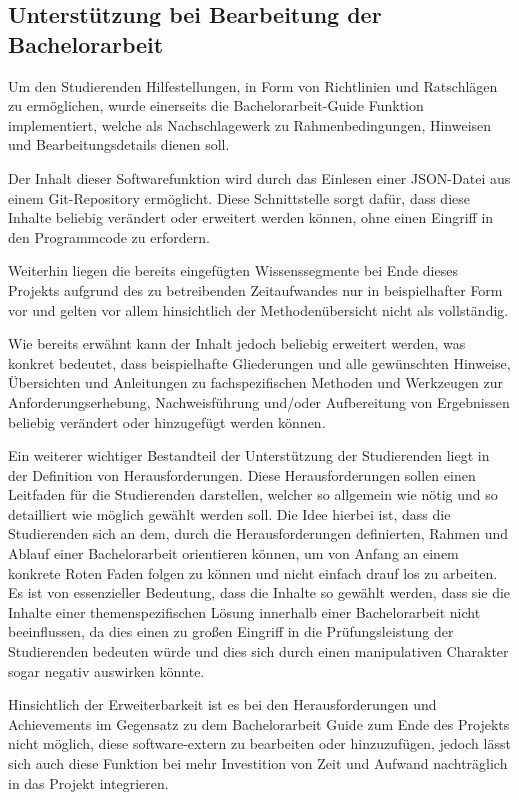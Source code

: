 \documentclass[bibliography=totoc,listof=totoc,BCOR=5mm,DIV=12,oneside]{scrbook}
\begin{document}
\subsection{Unterstützung bei Bearbeitung der Bachelorarbeit}
\par Um den Studierenden Hilfestellungen, in Form von Richtlinien und Ratschlägen zu ermöglichen, wurde einerseits die Bachelorarbeit-Guide Funktion implementiert, welche als Nachschlagewerk zu Rahmenbedingungen, Hinweisen und Bearbeitungsdetails dienen soll. 
\par Der Inhalt dieser Softwarefunktion wird durch das Einlesen einer JSON-Datei aus einem Git-Repository ermöglicht. Diese Schnittstelle sorgt dafür, dass diese Inhalte beliebig verändert oder erweitert werden können, ohne einen Eingriff in den Programmcode zu erfordern.
\par Weiterhin liegen die bereits eingefügten Wissenssegmente bei Ende dieses Projekts aufgrund des zu betreibenden Zeitaufwandes nur in beispielhafter Form vor und gelten vor allem hinsichtlich der Methodenübersicht nicht als vollständig.
\par Wie bereits erwähnt kann der Inhalt jedoch beliebig erweitert werden, was konkret bedeutet, dass  beispielhafte Gliederungen und alle gewünschten Hinweise, Übersichten und Anleitungen zu fachspezifischen Methoden und Werkzeugen zur Anforderungserhebung, Nachweisführung und/oder Aufbereitung von Ergebnissen beliebig verändert oder hinzugefügt werden können.
\par \bigskip Ein weiterer wichtiger Bestandteil der Unterstützung der Studierenden liegt in der Definition von Herausforderungen. Diese Herausforderungen sollen einen Leitfaden für die Studierenden darstellen, welcher so allgemein wie nötig und so detailliert wie möglich gewählt werden soll. Die Idee hierbei ist, dass die Studierenden sich an dem, durch die Herausforderungen definierten, Rahmen und Ablauf einer Bachelorarbeit orientieren können, um von Anfang an einem konkrete Roten Faden folgen zu können und nicht \grqq einfach drauf los\grqq{} zu arbeiten. Es ist von essenzieller Bedeutung, dass die Inhalte so gewählt werden, dass  sie die Inhalte einer themenspezifischen Lösung innerhalb einer Bachelorarbeit nicht beeinflussen, da dies einen zu großen Eingriff in die Prüfungsleistung der Studierenden bedeuten würde und dies sich durch einen manipulativen Charakter sogar negativ auswirken könnte.
\par Hinsichtlich der Erweiterbarkeit ist es bei den Herausforderungen und Achievements im Gegensatz zu dem Bachelorarbeit Guide zum Ende des Projekts nicht möglich, diese software-extern zu bearbeiten oder hinzuzufügen, jedoch lässt sich auch diese Funktion bei mehr Investition von Zeit und Aufwand nachträglich in das Projekt integrieren.
\end{document}
